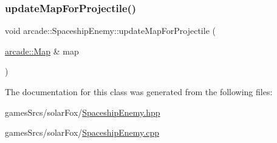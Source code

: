 \mbox{\label{classarcade_1_1_spaceship_enemy_acdf6714050c6622c4f67473ec1866404}} 
\subsubsection{\texorpdfstring{update\+Map\+For\+Projectile()}{updateMapForProjectile()}}
{\footnotesize\ttfamily void arcade\+::\+Spaceship\+Enemy\+::update\+Map\+For\+Projectile (\begin{DoxyParamCaption}\item[{\hyperlink{classarcade_1_1_map}{arcade\+::\+Map} \&}]{map }\end{DoxyParamCaption})\hspace{0.3cm}{\ttfamily [virtual]}}



The documentation for this class was generated from the following files\+:\begin{DoxyCompactItemize}
\item 
games\+Srcs/solar\+Fox/\hyperlink{_spaceship_enemy_8hpp}{Spaceship\+Enemy.\+hpp}\item 
games\+Srcs/solar\+Fox/\hyperlink{_spaceship_enemy_8cpp}{Spaceship\+Enemy.\+cpp}\end{DoxyCompactItemize}
